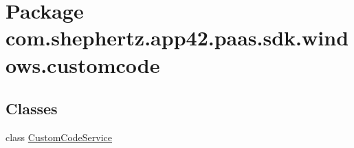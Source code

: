 \hypertarget{namespacecom_1_1shephertz_1_1app42_1_1paas_1_1sdk_1_1windows_1_1customcode}{\section{Package com.\+shephertz.\+app42.\+paas.\+sdk.\+windows.\+customcode}
\label{namespacecom_1_1shephertz_1_1app42_1_1paas_1_1sdk_1_1windows_1_1customcode}
}
\subsection*{Classes}
\begin{DoxyCompactItemize}
\item 
class \hyperlink{classcom_1_1shephertz_1_1app42_1_1paas_1_1sdk_1_1windows_1_1customcode_1_1_custom_code_service}{Custom\+Code\+Service}
\end{DoxyCompactItemize}
